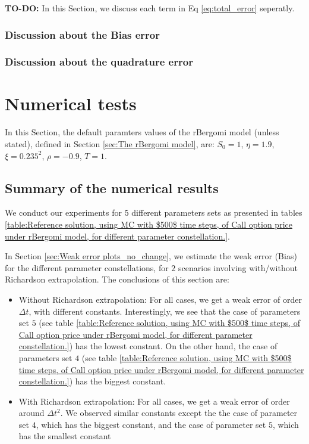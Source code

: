 \documentclass[11pt]{article}
\begin{document}
\textbf{TO-DO:} In this Section, we discuss each term in Eq \ref{eq:total_error} seperatly.
\subsubsection{Discussion about the Bias error}
\subsubsection{Discussion about the quadrature error}

\section{Numerical tests}\label{sec:Numerical tests}
In this Section, the default paramters values of the rBergomi model  (unless stated), defined in Section \ref{sec:The rBergomi model}, are: $S_0=1$, $\eta=1.9$, $\xi=0.235^2$, $\rho=-0.9$, $T=1$. 

\subsection{Summary of the numerical results}

We conduct our experiments for $5$ different parameters  sets as presented in tables \ref{table:Reference solution, using MC with $500$ time steps, of Call option price under rBergomi model, for different parameter constellation.}. 

In Section \ref{sec:Weak error plots_no_change}, we estimate the weak error  (Bias) for the different parameter constellations, for $2$ scenarios involving with/without  Richardson extrapolation. The conclusions of this section are: 
\begin{itemize}
	\item Without Richardson extrapolation: For all cases, we get a weak error of order $\Delta t$, with different  constants. Interestingly, we see that the case of parameters set $5$ (see table \ref{table:Reference solution, using MC with $500$ time steps, of Call option price under rBergomi model, for different parameter constellation.}) has the lowest constant. On the other hand, the case of parameters set $4$ (see table \ref{table:Reference solution, using MC with $500$ time steps, of Call option price under rBergomi model, for different parameter constellation.}) has the biggest constant.
	
		\item With Richardson extrapolation: For all cases, we get a weak error of order around  $\Delta t^2$. We observed similar constants except the the case of parameter set $4$, which has the biggest constant, and  the case of parameter set $5$, which has the smallest constant
\end{itemize}
\end{document}
